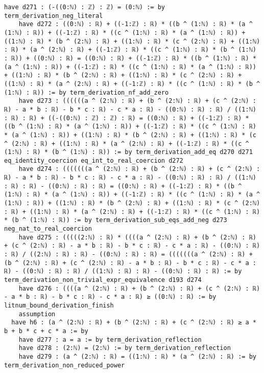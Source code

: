 \documentclass{article}
\begin{document}
\begin{tcolorbox}[colback=white!10, width=\linewidth]
\begin{lstlisting}[language=Lean4]
    have d271 : (-((0:ℕ) : ℤ) : ℤ) = (0:ℕ) := by term_derivation_neg_literal
    have d272 : ((0:ℕ) : ℝ) + ((-1:ℤ) : ℝ) * ((b ^ (1:ℕ) : ℝ) * (a ^ (1:ℕ) : ℝ)) + ((-1:ℤ) : ℝ) * ((c ^ (1:ℕ) : ℝ) * (a ^ (1:ℕ) : ℝ)) + ((1:ℕ) : ℝ) * (b ^ (2:ℕ) : ℝ) + ((1:ℕ) : ℝ) * (c ^ (2:ℕ) : ℝ) + ((1:ℕ) : ℝ) * (a ^ (2:ℕ) : ℝ) + ((-1:ℤ) : ℝ) * ((c ^ (1:ℕ) : ℝ) * (b ^ (1:ℕ) : ℝ)) + ((0:ℕ) : ℝ) = ((0:ℕ) : ℝ) + ((-1:ℤ) : ℝ) * ((b ^ (1:ℕ) : ℝ) * (a ^ (1:ℕ) : ℝ)) + ((-1:ℤ) : ℝ) * ((c ^ (1:ℕ) : ℝ) * (a ^ (1:ℕ) : ℝ)) + ((1:ℕ) : ℝ) * (b ^ (2:ℕ) : ℝ) + ((1:ℕ) : ℝ) * (c ^ (2:ℕ) : ℝ) + ((1:ℕ) : ℝ) * (a ^ (2:ℕ) : ℝ) + ((-1:ℤ) : ℝ) * ((c ^ (1:ℕ) : ℝ) * (b ^ (1:ℕ) : ℝ)) := by term_derivation_nf_add_zero
    have d273 : ((((((a ^ (2:ℕ) : ℝ) + (b ^ (2:ℕ) : ℝ) + (c ^ (2:ℕ) : ℝ) - a * b : ℝ) - b * c : ℝ) - c * a : ℝ) - ((0:ℕ) : ℝ) : ℝ) / ((1:ℕ) : ℝ) : ℝ) + ((-((0:ℕ) : ℤ) : ℤ) : ℝ) = ((0:ℕ) : ℝ) + ((-1:ℤ) : ℝ) * ((b ^ (1:ℕ) : ℝ) * (a ^ (1:ℕ) : ℝ)) + ((-1:ℤ) : ℝ) * ((c ^ (1:ℕ) : ℝ) * (a ^ (1:ℕ) : ℝ)) + ((1:ℕ) : ℝ) * (b ^ (2:ℕ) : ℝ) + ((1:ℕ) : ℝ) * (c ^ (2:ℕ) : ℝ) + ((1:ℕ) : ℝ) * (a ^ (2:ℕ) : ℝ) + ((-1:ℤ) : ℝ) * ((c ^ (1:ℕ) : ℝ) * (b ^ (1:ℕ) : ℝ)) := by term_derivation_add_eq d270 d271 eq_identity_coercion eq_int_to_real_coercion d272
    have d274 : (((((((a ^ (2:ℕ) : ℝ) + (b ^ (2:ℕ) : ℝ) + (c ^ (2:ℕ) : ℝ) - a * b : ℝ) - b * c : ℝ) - c * a : ℝ) - ((0:ℕ) : ℝ) : ℝ) / ((1:ℕ) : ℝ) : ℝ) - ((0:ℕ) : ℝ) : ℝ) = ((0:ℕ) : ℝ) + ((-1:ℤ) : ℝ) * ((b ^ (1:ℕ) : ℝ) * (a ^ (1:ℕ) : ℝ)) + ((-1:ℤ) : ℝ) * ((c ^ (1:ℕ) : ℝ) * (a ^ (1:ℕ) : ℝ)) + ((1:ℕ) : ℝ) * (b ^ (2:ℕ) : ℝ) + ((1:ℕ) : ℝ) * (c ^ (2:ℕ) : ℝ) + ((1:ℕ) : ℝ) * (a ^ (2:ℕ) : ℝ) + ((-1:ℤ) : ℝ) * ((c ^ (1:ℕ) : ℝ) * (b ^ (1:ℕ) : ℝ)) := by term_derivation_sub_eqs_add_neg d273 neg_nat_to_real_coercion
    have d275 : (((((2:ℕ) : ℝ) * ((((a ^ (2:ℕ) : ℝ) + (b ^ (2:ℕ) : ℝ) + (c ^ (2:ℕ) : ℝ) - a * b : ℝ) - b * c : ℝ) - c * a : ℝ) - ((0:ℕ) : ℝ) : ℝ) / ((2:ℕ) : ℝ) : ℝ) - ((0:ℕ) : ℝ) : ℝ) = (((((((a ^ (2:ℕ) : ℝ) + (b ^ (2:ℕ) : ℝ) + (c ^ (2:ℕ) : ℝ) - a * b : ℝ) - b * c : ℝ) - c * a : ℝ) - ((0:ℕ) : ℝ) : ℝ) / ((1:ℕ) : ℝ) : ℝ) - ((0:ℕ) : ℝ) : ℝ) := by term_derivation_non_trivial_expr_equivalence d193 d274
    have d276 : ((((a ^ (2:ℕ) : ℝ) + (b ^ (2:ℕ) : ℝ) + (c ^ (2:ℕ) : ℝ) - a * b : ℝ) - b * c : ℝ) - c * a : ℝ) ≥ ((0:ℕ) : ℝ) := by litnum_bound_derivation_finish
    assumption
  have h6 : (a ^ (2:ℕ) : ℝ) + (b ^ (2:ℕ) : ℝ) + (c ^ (2:ℕ) : ℝ) ≥ a * b + b * c + c * a := by
    have d277 : a = a := by term_derivation_reflection
    have d278 : (2:ℕ) = (2:ℕ) := by term_derivation_reflection
    have d279 : (a ^ (2:ℕ) : ℝ) = ((1:ℕ) : ℝ) * (a ^ (2:ℕ) : ℝ) := by term_derivation_non_reduced_power

\end{lstlisting}
\end{tcolorbox}
\end{document}
